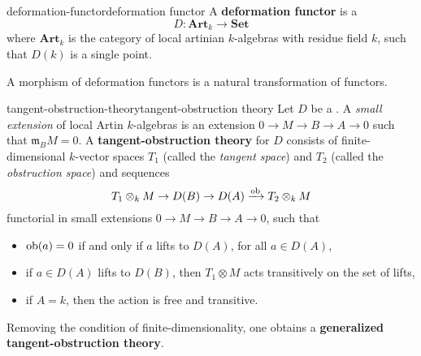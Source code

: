\begin{topic}{deformation-functor}{deformation functor}
    A \textbf{deformation functor} is a 
    \[ D : \textbf{Art}_k \to \textbf{Set} \]
    where $\textbf{Art}_k$ is the category of local artinian $k$-algebras with residue field $k$, such that $D(k)$ is a single point.
    
    A morphism of deformation functors is a natural transformation of functors.
\end{topic}

\begin{topic}{tangent-obstruction-theory}{tangent-obstruction theory}
    Let $D$ be a . A \textit{small extension} of local Artin $k$-algebras is an extension $0 \to M \to B \to A \to 0$ such that $\mathfrak{m}_B M = 0$. A \textbf{tangent-obstruction theory} for $D$ consists of finite-dimensional $k$-vector spaces $T_1$ (called the \textit{tangent space}) and $T_2$ (called the \textit{obstruction space}) and sequences
    \[ T_1 \otimes_k M \to D(B) \to D(A) \xrightarrow{\textup{ob}} T_2 \otimes_k M \]
    functorial in small extensions $0 \to M \to B \to A \to 0$, such that
    \begin{itemize}
        \item $\textup{ob}(a) = 0$ if and only if $a$ lifts to $D(A)$, for all $a \in D(A)$,
        \item if $a \in D(A)$ lifts to $D(B)$, then $T_1 \otimes M$ acts transitively on the set of lifts,
        \item if $A = k$, then the action is free and transitive.
    \end{itemize}
    Removing the condition of finite-dimensionality, one obtains a \textbf{generalized tangent-obstruction theory}.
\end{topic}

